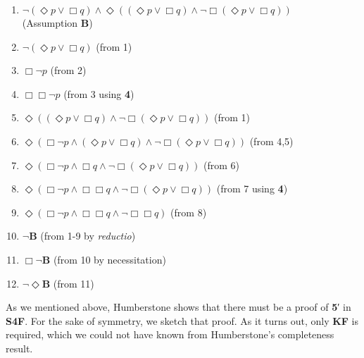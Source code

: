 \documentclass[
  11pt,
  letterpaper,
  DIV=11,
  numbers=noendperiod,
  twoside]{scrartcl}
\providecommand{\tightlist}{%
  \setlength{\itemsep}{0pt}\setlength{\parskip}{0pt}}
\begin{document}
\begin{enumerate}
\def\labelenumi{\arabic{enumi}.}
\tightlist
\item
  \(\neg (\Diamond{p}\vee \Box q) \wedge \Diamond((\Diamond{p}\vee \Box q) \wedge \neg \Box (\Diamond{p}\vee \Box q))\)\\
  (Assumption \textbf{B})
\item
  \(\neg (\Diamond{p}\vee \Box q)\) (from 1)
\item
  \(\Box \neg p\) (from 2)
\item
  \(\Box \Box \neg p\) (from 3 using \textbf{4})
\item
  \(\Diamond((\Diamond{p}\vee \Box q) \wedge \neg \Box (\Diamond{p}\vee \Box q))\)
  (from 1)
\item
  \(\Diamond(\Box \neg p \wedge (\Diamond{p}\vee \Box q) \wedge \neg \Box (\Diamond{p}\vee \Box q))\)
  (from 4,5)
\item
  \(\Diamond(\Box \neg p \wedge \Box q \wedge \neg \Box (\Diamond{p}\vee \Box q))\)
  (from 6)
\item
  \(\Diamond(\Box \neg p \wedge \Box \Box q \wedge \neg \Box (\Diamond{p}\vee \Box q))\)
  (from 7 using \textbf{4})
\item
  \(\Diamond(\Box \neg p \wedge \Box \Box q \wedge \neg \Box \Box q)\)
  (from 8)
\item
  \(\neg\)\textbf{B} (from 1-9 by \emph{reductio})
\item
  \(\Box \neg\)\textbf{B} (from 10 by necessitation)
\item
  \(\neg \Diamond\)\textbf{B} (from 11)
\end{enumerate}

As we mentioned above, Humberstone shows that there must be a proof of
\textbf{5}′ in \textbf{S4F}. For the sake of symmetry, we sketch that
proof. As it turns out, only \textbf{KF} is required, which we could not
have known from Humberstone's completeness result.
\end{document}

